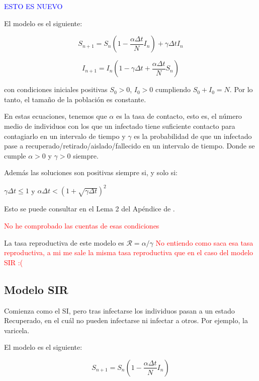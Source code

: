 \textcolor{blue}{ESTO ES NUEVO}

El modelo es el siguiente:

\begin{equation}
\label{eqn: modelo_SIS_S}
S_{n+1} = S_n \left(1-\frac{\alpha\Delta t}{N} I_n \right) + \gamma \Delta t I_n
\end{equation}

\begin{equation}
\label{eqn: modelo_SIS_I}
I_{n+1} = I_n \left( 1-\gamma \Delta t + \frac{\alpha\Delta t}{N} S_n \right)
\end{equation}

con condiciones iniciales positivas $S_0>0$, $I_0>0$ cumpliendo $S_0+I_0=N$. Por lo tanto, el tamaño de la población es constante.

En estas ecuaciones, tenemos que $\alpha$ es la tasa de contacto, esto es, el número medio de individuos con los que un infectado tiene suficiente contacto para contagiarlo en un intervalo de tiempo y $\gamma$ es la probabilidad de que un infectado pase a recuperado/retirado/aislado/fallecido en un intervalo de tiempo. Donde se cumple $\alpha >0$ y $\gamma >0$ siempre.

Además las soluciones son positivas siempre si, y solo si:

$\gamma \Delta t \leq 1$ y $\alpha\Delta t< \left( 1+\sqrt{\gamma \Delta t} \right)^2$

Esto se puede consultar en el Lema 2 del Apéndice de \cite{allenDiscretetimeSISIR1994}.

\textcolor{red}{No he comprobado las cuentas de esas condiciones}

La tasa reproductiva de este modelo es $\mathcal{R}=\alpha /\gamma$ \textcolor{red}{No entiendo como saca esa tasa reproductiva, a mi me sale la misma tasa reproductiva que en el caso del modelo SIR :(}

 

\subsection{Modelo SIR}
Comienza como el SI, pero tras infectarse los individuos pasan a un estado Recuperado, en el cuál no pueden infectarse ni infectar a otros.
Por ejemplo, la varicela. 

El modelo es el siguiente:

\begin{equation}
\label{eqn: SIR_modelo_S}
S_{n+1} = S_n \left(1-\frac{\alpha\Delta t}{N} I_n \right)
\end{equation}

